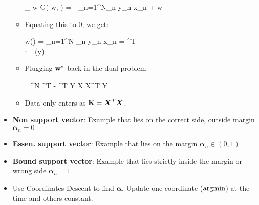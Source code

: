 \begin{itemize}
\begin{itemize}
\begin{myalign*}
		    \bm \nabla_{\* w} G(\* w, \bm \alpha) = - \sum_{n=1}^N\alpha_n \*y_n \* x_n + \lambda \* w
		\end{myalign*}
		\item Equating this to 0, we get:
			\begin{myalign*}
			  \* w(\bm \alpha) =  \sum_{n=1}^N \alpha_n \*y_n \*x_n =  ^T\bm \alpha \\
			   := (\bm y)
			\end{myalign*}
		\item Plugging $\mathbf{w}^*$ back in the dual problem
		\begin{myalign*}
		    \max_{\bm \alpha \in [0, 1]^N} \bm \alpha^T  -  \bm \alpha^T \*Y \* X  \*X^T \* Y \bm \alpha
		\end{myalign*}
		\item Data only enters as $\mathbf{K} = \bm X^T \bm X$.
	\end{itemize}
\end{itemize}

\begin{itemize}
	\item {\bf Non support vector}: Example that lies on the correct side, outside margin $\bm \alpha_n = 0$
	\item {\bf Essen. support vector}: Example that lies on the margin $\bm \alpha_n \in (0,1)$
	\item {\bf Bound support vector}: Example that lies strictly inside the margin or wrong side $\bm \alpha_n = 1$
	\item Use Coordinates Descent to find $\bm \alpha$. Update one coordinate ($\operatorname*{argmin}$) at the time and others constant.
\end{itemize}


